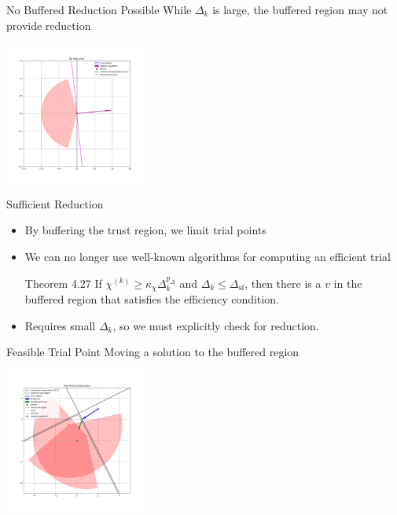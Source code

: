 \documentclass{beamer}
\begin{document}
\begin{frame}{No Buffered Reduction Possible}
	While $\Delta_k$ is large, the buffered region may not provide reduction
	\begin{center}
		\includegraphics[width=175px]{images/no_reduction.png}
	\end{center}
\end{frame}


\begin{frame}{Sufficient Reduction}
	\begin{itemize}
		\item By buffering the trust region, we limit trial points
		\item We can no longer use well-known algorithms for computing an efficient trial
		\begin{block}{Theorem 4.27}
			If $\chi^{(k)} \ge \kappa_{\chi} \Delta_k^{p_{\Delta}}$ and $\Delta_k \le \Delta_{\textrm{sf}}$,
			then there is a $v$ in the buffered region that satisfies the efficiency condition.
		\end{block}
		\item Requires small $\Delta_k$, so we must explicitly check for reduction.
		
	\end{itemize}
\end{frame}


\begin{frame}{Feasible Trial Point}
	Moving a solution to the buffered region
	\begin{center}
		\includegraphics[width=175px]{images/trial_point_constructions.png}
	\end{center}
\end{frame}
\end{document}
